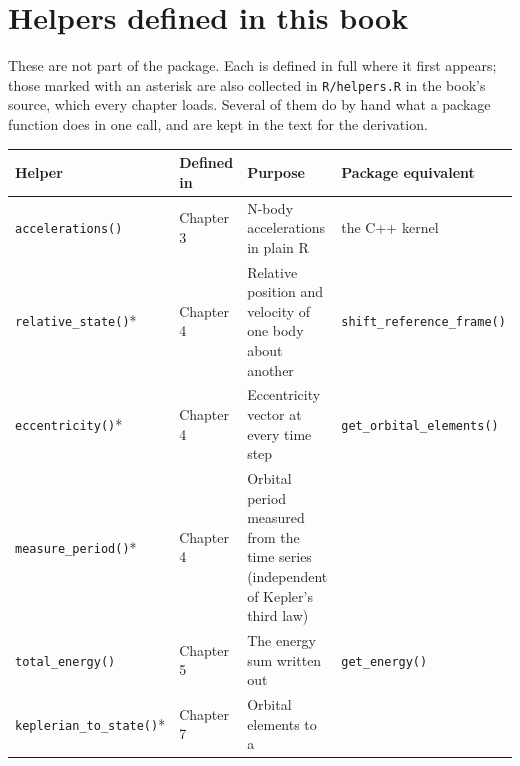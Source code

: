\documentclass[
  10.5pt,
  letterpaper,
]{scrbook}
\newcounter{none} %
\theoremstyle{plain}
\theoremstyle{remark}
\begin{document}
\section{Helpers defined in this
book}\label{helpers-defined-in-this-book}

These are not part of the package. Each is defined in full where it
first appears; those marked with an asterisk are also collected in
\texttt{R/helpers.R} in the book's source, which every chapter loads.
Several of them do by hand what a package function does in one call, and
are kept in the text for the derivation.

{\def\LTcaptype{none} %
\begin{longtable}[]{@{}
  >{\raggedright\arraybackslash}p{}
  >{\raggedright\arraybackslash}p{}
  >{\raggedright\arraybackslash}p{}
  >{\raggedright\arraybackslash}p{}@{}}
\toprule\noalign{}
\begin{minipage}[b]{\linewidth}\raggedright
Helper
\end{minipage} & \begin{minipage}[b]{\linewidth}\raggedright
Defined in
\end{minipage} & \begin{minipage}[b]{\linewidth}\raggedright
Purpose
\end{minipage} & \begin{minipage}[b]{\linewidth}\raggedright
Package equivalent
\end{minipage} \\
\midrule\noalign{}
\endhead
\bottomrule\noalign{}
\endlastfoot
\texttt{accelerations()} & Chapter 3 & N-body accelerations in plain R &
the C++ kernel \\
\texttt{relative\_state()}* & Chapter 4 & Relative position and velocity
of one body about another & \texttt{shift\_reference\_frame()} \\
\texttt{eccentricity()}* & Chapter 4 & Eccentricity vector at every time
step & \texttt{get\_orbital\_elements()} \\
\texttt{measure\_period()}* & Chapter 4 & Orbital period measured from
the time series (independent of Kepler's third law) & \\
\texttt{total\_energy()} & Chapter 5 & The energy sum written out &
\texttt{get\_energy()} \\
\texttt{keplerian\_to\_state()}* & Chapter 7 & Orbital elements to a

\end{longtable}}
\end{document}
